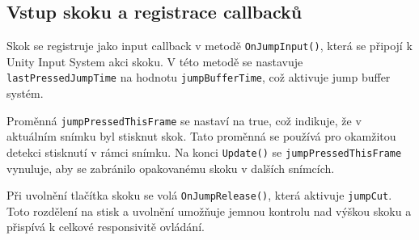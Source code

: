 \subsection{Vstup skoku a registrace callbacků}

Skok se registruje jako input callback v metodě \texttt{OnJumpInput()}, která se připojí k Unity Input System akci skoku. V této metodě se nastavuje \texttt{lastPressedJumpTime} na hodnotu \texttt{jumpBufferTime}, což aktivuje jump buffer systém.

Proměnná \texttt{jumpPressedThisFrame} se nastaví na true, což indikuje, že v aktuálním snímku byl stisknut skok. Tato proměnná se používá pro okamžitou detekci stisknutí v rámci snímku. Na konci \texttt{Update()} se \texttt{jumpPressedThisFrame} vynuluje, aby se zabránilo opakovanému skoku v dalších snímcích.

Při uvolnění tlačítka skoku se volá \texttt{OnJumpRelease()}, která aktivuje \texttt{jumpCut}. Toto rozdělení na stisk a uvolnění umožňuje jemnou kontrolu nad výškou skoku a přispívá k celkové responsivitě ovládání.